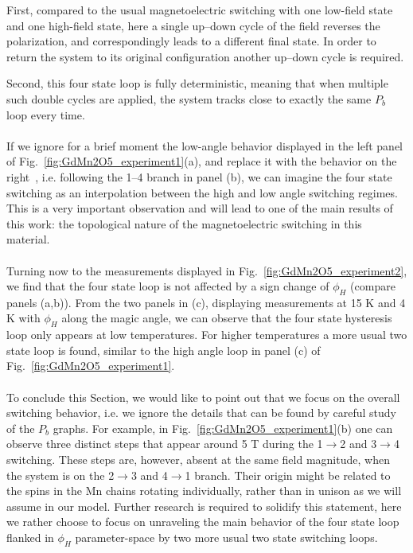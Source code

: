 First, compared to the usual magnetoelectric switching with one low-field state and one high-field state, here a single up--down cycle of the field reverses the polarization, and correspondingly leads to a different final state.
In order to return the system to its original configuration another up--down cycle is required.

Second, this four state loop is fully deterministic, meaning that when multiple such double cycles are applied, the system tracks close to exactly the same $P_b$ loop every time.
\\\\
If we ignore for a brief moment the low-angle behavior displayed in the left panel of Fig.~\ref{fig:GdMn2O5_experiment1}(a), and replace it with the behavior on the right~\cite{Lee13}, i.e. following the 1--4 branch in panel (b), we can imagine the four state switching as an interpolation between the high and low angle switching regimes.
This is a very important observation and will lead to one of the main results of this work: the topological nature of the magnetoelectric switching in this material.
\\\\
Turning now to the measurements displayed in Fig.~\ref{fig:GdMn2O5_experiment2}, we find that the four state loop is not affected by a sign change of $\phi_H$ (compare panels (a,b)).
From the two panels in (c), displaying measurements at 15 K and 4 K with $\phi_H$ along the magic angle, we can observe that the four state hysteresis loop only appears at low temperatures.
For higher temperatures a more usual two state loop is found, similar to the high angle loop in panel (c) of Fig.~\ref{fig:GdMn2O5_experiment1}.
\\\\
To conclude this Section, we would like to point out that we focus on the overall switching behavior, i.e. we ignore the details that can be found by careful study of the $P_b$ graphs.
For example, in Fig.~\ref{fig:GdMn2O5_experiment1}(b) one can observe three distinct steps that appear around 5 T during the 1$\rightarrow$2 and 3$\rightarrow$4 switching.
These steps are, however, absent at the same field magnitude, when the system is on the 2$\rightarrow$3 and 4$\rightarrow$1 branch.
Their origin might be related to the spins in the Mn chains rotating individually, rather than in unison as we will assume in our model.
Further research is required to solidify this statement, here we rather choose to focus on unraveling the main behavior of the four state loop flanked in $\phi_H$ parameter-space by two more usual two state switching loops.


